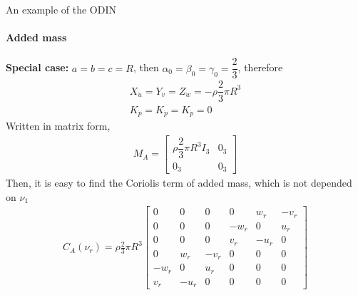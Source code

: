 



\begin{frame}{An example of the ODIN}
	\framesubtitle{Added mass}
	\textbf{Special case:} $a = b = c = R$, then $\alpha_0 = \beta_0 = \gamma_0 = \dfrac{2}{3}$, therefore
	\begin{align}
		X_{\dot{u}} = Y_{\dot{v}} = Z_{\dot{w}} = -\rho\dfrac{2}{3}\pi R^3\\
		K_{\dot{p}} = K_{\dot{p}} = K_{\dot{p}} = 0
	\end{align}
	Written in matrix form,
	\begin{align}
		M_A = \begin{bmatrix}
			\rho\dfrac{2}{3}\pi R^3 I_3 & 0_3 \\ 0_3 & 0_3
		\end{bmatrix}
	\end{align}
	Then, it is easy to find the Coriolis term of added mass, which is not depended on $\nu_1$
	\begin{align}
		C_A(\nu_r) = \rho \frac{2}{3} \pi R^3
		\begin{bmatrix}
			0 & 0 & 0 & 0 & w_r & -v_r \\
			0 & 0 & 0 & -w_r & 0 & u_r \\
			0 & 0 & 0 & v_r & -u_r & 0 \\
			0 & w_r & -v_r & 0 & 0 & 0 \\
			-w_r & 0 & u_r & 0 & 0 & 0 \\
			v_r & -u_r & 0 & 0 & 0 & 0
		\end{bmatrix}
	\end{align}
\end{frame}







